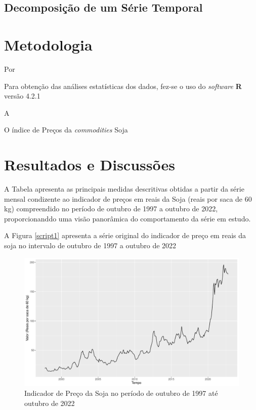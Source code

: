 \documentclass[
	12pt,				%
	openright,			%
	oneside,      %
	a4paper,			%
	english,			%
	french,				%
	spanish,			%
	brazil,				%
	]{abntex2}\usepackage[]{graphicx}\usepackage[]{xcolor}
\makeatletter
\def\maxwidth{ %
  \ifdim\Gin@nat@width>\linewidth
    \linewidth
  \else
    \Gin@nat@width
  \fi
}
\newenvironment{knitrout}{}{} %
\makeatother
\begin{document}
  \section{Decomposição de um Série Temporal}





\chapter{Metodologia}

Por 


Para obtenção das análises estatísticas dos dados, fez-se o uso do \textit{software} \textbf{R} versão 4.2.1


A 


O índice de Preços da \textit{commodities} Soja 




\chapter{Resultados e Discussões}

A Tabela apresenta as principais medidas descritivas obtidas a partir da série mensal 
condizente ao indicador de preços em reais da Soja (reais por saca de 60 kg) compreendido 
no período de outubro de 1997 a outubro de 2022, proporcionanddo uma visão panorâmica do comportamento da série em estudo.








A Figura \ref{script1} apresenta a série original do indicador de preço em reais da soja no intervalo de outubro de 1997 a outubro de 2022 

\begin{knitrout}
\color{fgcolor}\begin{figure}
\includegraphics[width=\maxwidth]{figure/script1-1} \caption[Indicador de Preço da Soja no período de outubro de 1997 até outubro de 2022]{Indicador de Preço da Soja no período de outubro de 1997 até outubro de 2022}\label{fig:script1}
\end{figure}

\end{knitrout}
\end{document}

